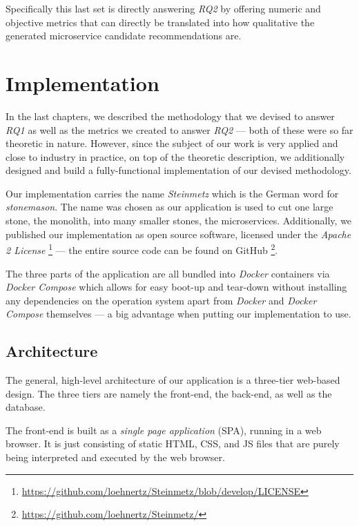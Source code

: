 \documentclass[12pt,a4paper]{report}
\begin{document}
Specifically this last set is directly answering \textit{RQ2} by offering
numeric and objective metrics that can directly be translated into how
qualitative the generated microservice candidate recommendations are.




\chapter{Implementation} \label{chap:implementation}

In the last chapters, we described the methodology that we devised to answer
\textit{RQ1} as well as the metrics we created to answer \textit{RQ2} ---
both of these were so far theoretic in nature.
However, since the subject of our work is very applied and close to industry
in practice, on top of the theoretic description, we additionally designed
and build a fully-functional implementation of our devised methodology.

Our implementation carries the name \textit{Steinmetz} which is the German
word for \textit{stonemason}. The name was chosen as our application is used
to cut one large stone, the monolith, into many smaller stones, the microservices.
Additionally, we published our implementation as open source software,
licensed under the \textit{Apache 2 License}
\footnote{\url{https://github.com/loehnertz/Steinmetz/blob/develop/LICENSE}} ---
the entire source code can be found on GitHub
\footnote{\url{https://github.com/loehnertz/Steinmetz/}}.

The three parts of the application are all bundled into \textit{Docker} containers
via \textit{Docker Compose} which allows for easy boot-up and tear-down without
installing any dependencies on the operation system apart from \textit{Docker}
and \textit{Docker Compose} themselves \cite{docker} \cite{docker-compose} ---
a big advantage when putting our implementation to use.



\section{Architecture}
The general, high-level architecture of our application is a three-tier
web-based design. The three tiers are namely the front-end, the back-end,
as well as the database.

The front-end is built as a \textit{single page application} (SPA),
running in a web browser. It is just consisting of static HTML, CSS, and JS files
that are purely being interpreted and executed by the web browser.
\end{document}
